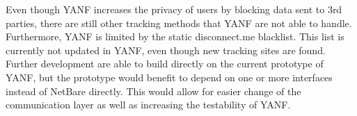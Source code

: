 \documentclass[main.tex]{subfiles}
\begin{document}
Even though YANF increases the privacy of users by blocking data sent to 3rd parties, there are still other tracking methods that YANF are not able to handle. Furthermore, YANF is limited by the static disconnect.me blacklist. This list is currently not updated in YANF, even though new tracking sites are found. Further development are able to build directly on the current prototype of YANF, but the prototype would benefit to depend on one or more interfaces instead of NetBare directly. This would allow for easier change of the communication layer as well as increasing the testability of YANF.


\end{document}
